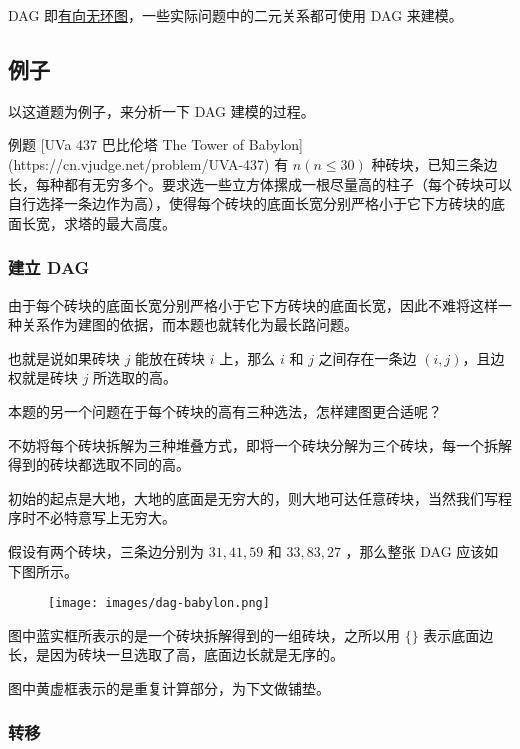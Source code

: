 
DAG 即\href{/graph/dag}{有向无环图}，一些实际问题中的二元关系都可使用 DAG 来建模。

\subsection{例子}

以这道题为例子，来分析一下 DAG 建模的过程。

\begin{NOTE}{ 例题 [UVa 437 巴比伦塔 The Tower of Babylon](https://cn.vjudge.net/problem/UVA-437)}{}
有 $n (n\leqslant 30)$ 种砖块，已知三条边长，每种都有无穷多个。要求选一些立方体摞成一根尽量高的柱子（每个砖块可以自行选择一条边作为高），使得每个砖块的底面长宽分别严格小于它下方砖块的底面长宽，求塔的最大高度。
\end{NOTE}


\subsubsection{建立 DAG}

由于每个砖块的底面长宽分别严格小于它下方砖块的底面长宽，因此不难将这样一种关系作为建图的依据，而本题也就转化为最长路问题。

也就是说如果砖块 $j$ 能放在砖块 $i$ 上，那么 $i$ 和 $j$ 之间存在一条边 $(i, j)$，且边权就是砖块 $j$ 所选取的高。

本题的另一个问题在于每个砖块的高有三种选法，怎样建图更合适呢？

不妨将每个砖块拆解为三种堆叠方式，即将一个砖块分解为三个砖块，每一个拆解得到的砖块都选取不同的高。

初始的起点是大地，大地的底面是无穷大的，则大地可达任意砖块，当然我们写程序时不必特意写上无穷大。

假设有两个砖块，三条边分别为 $31, 41, 59$ 和 $33, 83, 27$ ，那么整张 DAG 应该如下图所示。

\begin{figure}[h]
\centering
\texttt{[image: images/dag-babylon.png]} 

\end{figure}

图中蓝实框所表示的是一个砖块拆解得到的一组砖块，之所以用 $\{\}$ 表示底面边长，是因为砖块一旦选取了高，底面边长就是无序的。

图中黄虚框表示的是重复计算部分，为下文做铺垫。

\subsubsection{转移}

